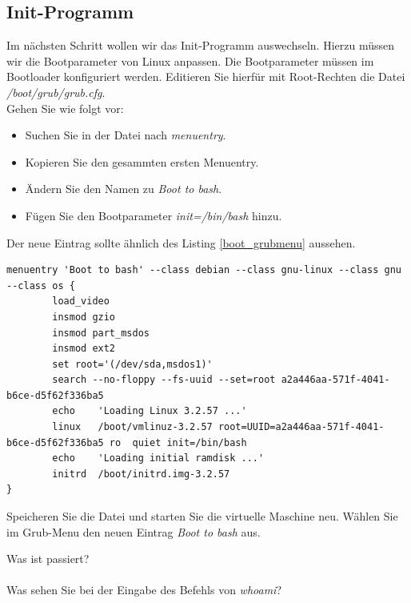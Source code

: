 \subsection{Init-Programm}

Im nächsten Schritt wollen wir das Init-Programm auswechseln. Hierzu müssen wir die 
Bootparameter von Linux anpassen. Die Bootparameter müssen im Bootloader konfiguriert 
werden. Editieren Sie hierfür mit Root-Rechten
die Datei \emph{/boot/grub/grub.cfg}. \\

Gehen Sie wie folgt vor:
\begin{itemize}
   \item Suchen Sie in der Datei nach \emph{menuentry}.
   \item Kopieren Sie den gesammten ersten Menuentry.
   \item Ändern Sie den Namen zu \emph{Boot to bash}.
   \item Fügen Sie den Bootparameter \emph{init=/bin/bash} hinzu.
\end{itemize}

Der neue Eintrag sollte ähnlich des Listing \ref{boot_grubmenu} aussehen.

\begin{lstlisting}[label=boot_grubmenu,caption=/boot/grub/grub.cfg]
menuentry 'Boot to bash' --class debian --class gnu-linux --class gnu --class os {
        load_video
        insmod gzio
        insmod part_msdos
        insmod ext2
        set root='(/dev/sda,msdos1)'
        search --no-floppy --fs-uuid --set=root a2a446aa-571f-4041-b6ce-d5f62f336ba5
        echo    'Loading Linux 3.2.57 ...'
        linux   /boot/vmlinuz-3.2.57 root=UUID=a2a446aa-571f-4041-b6ce-d5f62f336ba5 ro  quiet init=/bin/bash
        echo    'Loading initial ramdisk ...'
        initrd  /boot/initrd.img-3.2.57
}
\end{lstlisting}

Speicheren Sie die Datei und starten Sie die virtuelle Maschine neu. Wählen Sie im Grub-Menu den
neuen Eintrag \emph{Boot to bash} aus.

\clearpage

Was ist passiert? \\

\underline{\hspace{\textwidth}} \\


Was sehen Sie bei der Eingabe des Befehls von \emph{whoami}? \\

\underline{\hspace{\textwidth}}
